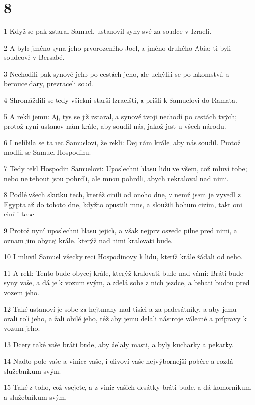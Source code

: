 \chapter{8}

\par 1 Když se pak zstaral Samuel, ustanovil syny své za soudce v Izraeli.
\par 2 A bylo jméno syna jeho prvorozeného Joel, a jméno druhého Abia; ti byli soudcové v Bersabé.
\par 3 Nechodili pak synové jeho po cestách jeho, ale uchýlili se po lakomství, a berouce dary, prevraceli soud.
\par 4 Shromáždili se tedy všickni starší Izraelští, a prišli k Samuelovi do Ramata.
\par 5 A rekli jemu: Aj, tys se již zstaral, a synové tvoji nechodí po cestách tvých; protož nyní ustanov nám krále, aby soudil nás, jakož jest u všech národu.
\par 6 I nelíbila se ta rec Samuelovi, že rekli: Dej nám krále, aby nás soudil. Protož modlil se Samuel Hospodinu.
\par 7 Tedy rekl Hospodin Samuelovi: Uposlechni hlasu lidu ve všem, což mluví tobe; nebo ne tebout jsou pohrdli, ale mnou pohrdli, abych nekraloval nad nimi.
\par 8 Podlé všech skutku tech, kteréž cinili od onoho dne, v nemž jsem je vyvedl z Egypta až do tohoto dne, kdyžto opustili mne, a sloužili bohum cizím, takt oni ciní i tobe.
\par 9 Protož nyní uposlechni hlasu jejich, a však nejprv osvedc pilne pred nimi, a oznam jim obycej krále, kterýž nad nimi kralovati bude.
\par 10 I mluvil Samuel všecky reci Hospodinovy k lidu, kteríž krále žádali od neho.
\par 11 A rekl: Tento bude obycej krále, kterýž kralovati bude nad vámi: Bráti bude syny vaše, a dá je k vozum svým, a zdelá sobe z nich jezdce, a behati budou pred vozem jeho.
\par 12 Také ustanoví je sobe za hejtmany nad tisíci a za padesátníky, a aby jemu orali rolí jeho, a žali obilé jeho, též aby jemu delali nástroje válecné a prípravy k vozum jeho.
\par 13 Dcery také vaše bráti bude, aby delaly masti, a byly kucharky a pekarky.
\par 14 Nadto pole vaše a vinice vaše, i olivoví vaše nejvýbornejší pobére a rozdá služebníkum svým.
\par 15 Také z toho, což vsejete, a z vinic vašich desátky bráti bude, a dá komorníkum a služebníkum svým.
